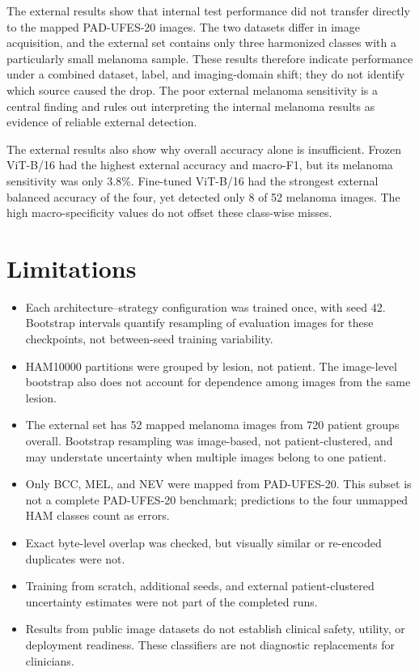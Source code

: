 \documentclass[11pt]{article}
\begin{document}
The external results show that internal test performance did not transfer directly to the mapped PAD-UFES-20 images. The two datasets differ in image acquisition, and the external set contains only three harmonized classes with a particularly small melanoma sample. These results therefore indicate performance under a combined dataset, label, and imaging-domain shift; they do not identify which source caused the drop. The poor external melanoma sensitivity is a central finding and rules out interpreting the internal melanoma results as evidence of reliable external detection.

The external results also show why overall accuracy alone is insufficient. Frozen ViT-B/16 had the highest external accuracy and macro-F1, but its melanoma sensitivity was only 3.8\%. Fine-tuned ViT-B/16 had the strongest external balanced accuracy of the four, yet detected only 8 of 52 melanoma images. The high macro-specificity values do not offset these class-wise misses.

\section{Limitations}

\begin{itemize}
  \item Each architecture--strategy configuration was trained once, with seed 42. Bootstrap intervals quantify resampling of evaluation images for these checkpoints, not between-seed training variability.
  \item HAM10000 partitions were grouped by lesion, not patient. The image-level bootstrap also does not account for dependence among images from the same lesion.
  \item The external set has 52 mapped melanoma images from 720 patient groups overall. Bootstrap resampling was image-based, not patient-clustered, and may understate uncertainty when multiple images belong to one patient.
  \item Only BCC, MEL, and NEV were mapped from PAD-UFES-20. This subset is not a complete PAD-UFES-20 benchmark; predictions to the four unmapped HAM classes count as errors.
  \item Exact byte-level overlap was checked, but visually similar or re-encoded duplicates were not.
  \item Training from scratch, additional seeds, and external patient-clustered uncertainty estimates were not part of the completed runs.
  \item Results from public image datasets do not establish clinical safety, utility, or deployment readiness. These classifiers are not diagnostic replacements for clinicians.
\end{itemize}
\end{document}
